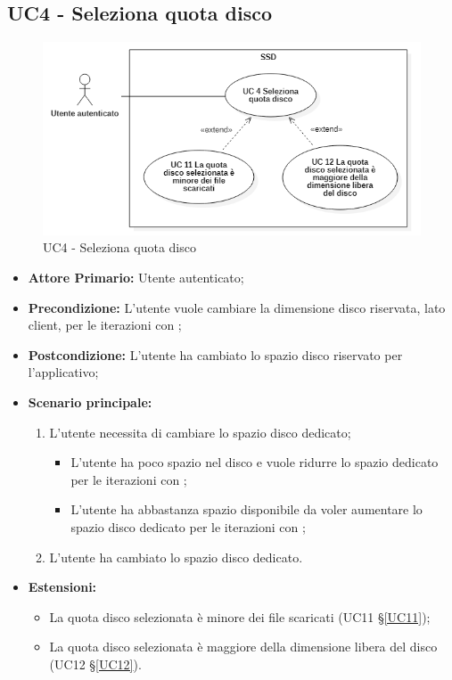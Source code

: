 \subsection{UC4 - Seleziona quota disco}
\label{UC4}
\begin{figure}[H]
    \centering
    \includegraphics[scale = 0.7]{components/img/UC4.png}
    \caption{UC4 - Seleziona quota disco}
\end{figure}
\begin{itemize}
\item \textbf{Attore Primario:} Utente autenticato;
\item \textbf{Precondizione:} L'utente vuole cambiare la dimensione disco riservata, lato client, per le iterazioni con ;
\item \textbf{Postcondizione:} L'utente ha cambiato lo spazio disco riservato per l'applicativo;
\item \textbf{Scenario principale:}
    \begin{enumerate}
    \item L'utente necessita di cambiare lo spazio disco dedicato;
        \begin{itemize}
        \item L'utente ha poco spazio nel disco e vuole ridurre lo spazio dedicato per le iterazioni con ;
        \item L'utente ha abbastanza spazio disponibile da voler aumentare lo spazio disco dedicato per le iterazioni con ;
        \end{itemize}
    \item L'utente ha cambiato lo spazio disco dedicato.
    \end{enumerate}
\item \textbf{Estensioni:}
    \begin{itemize}
        \item La quota disco selezionata è minore dei file scaricati (UC11 \S{}\ref{UC11});
        \item La quota disco selezionata è maggiore della dimensione libera del disco (UC12 \S{}\ref{UC12}).
    \end{itemize}
\end{itemize}